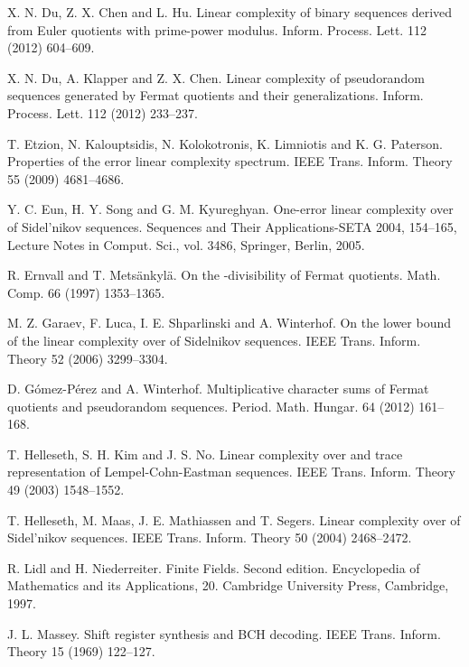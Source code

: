 \documentclass [11pt,a4paper]{article}
\begin{document}
\begin{thebibliography}{99}
X. N. Du, Z. X. Chen and L. Hu. Linear complexity of binary
sequences derived from Euler quotients with prime-power modulus.
Inform. Process. Lett. 112 (2012) 604--609.

X. N. Du, A. Klapper and Z. X. Chen. Linear complexity of
pseudorandom sequences generated by Fermat quotients and their
generalizations. Inform. Process. Lett. 112 (2012) 233--237.


T. Etzion, N. Kalouptsidis, N. Kolokotronis, K. Limniotis and K. G. Paterson. Properties of the error linear complexity spectrum. IEEE Trans. Inform. Theory 55 (2009)  4681--4686.

Y. C. Eun, H. Y. Song and G. M. Kyureghyan. One-error linear complexity over  of Sidel'nikov sequences.
Sequences and Their Applications-SETA 2004, 154--165, Lecture Notes in Comput. Sci., vol. 3486, Springer, Berlin, 2005.


 R. Ernvall and T. Mets{\"a}nkyl{\"a}.
On the -divisibility of Fermat quotients. Math. Comp.  66 (1997)
1353--1365.


M. Z. Garaev, F. Luca, I. E. Shparlinski and A. Winterhof. On the lower bound of the linear complexity over   of Sidelnikov sequences. IEEE Trans. Inform. Theory 52 (2006)  3299--3304.





 D. G\'{o}mez-P\'{e}rez and A. Winterhof. Multiplicative character sums of
Fermat quotients and pseudorandom sequences. Period. Math. Hungar.
64 (2012) 161--168.






T. Helleseth, S. H. Kim and  J. S. No. Linear complexity over    and trace representation of Lempel-Cohn-Eastman sequences. IEEE Trans. Inform. Theory 49 (2003)  1548--1552.

T. Helleseth, M. Maas, J. E. Mathiassen and  T. Segers. Linear complexity over  of Sidel'nikov sequences. IEEE Trans. Inform. Theory 50 (2004)  2468--2472.



 R. Lidl and H. Niederreiter. Finite Fields.
Second edition. Encyclopedia of Mathematics and its Applications, 20. Cambridge University Press, Cambridge, 1997.




 J. L. Massey. Shift register synthesis and BCH decoding. IEEE Trans. Inform.
Theory 15 (1969) 122--127.




\end{thebibliography}
\end{document}
